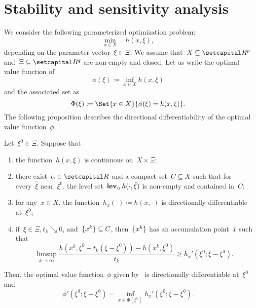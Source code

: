 \documentclass[../main]{subfiles}
\begin{document}
\section{Stability and sensitivity analysis}
We consider the following parameterized optimization problem:
\begin{equation} \label{eq:parameterized}
    \min_{x \in X} \quad h(x, \xi)
,\end{equation} 
depending on the parameter vector~$\xi \in \Xi$.
We assume that~$X \subseteq \setR^p$ and~$\Xi \subseteq \setR^q$ are non-empty and closed.
Let us write the optimal value function of~
\begin{equation} \label{eq:opt_val_fun}
    \phi(\xi) \coloneqq \inf_{x \in X} h(x, \xi)
\end{equation} 
and the associated set as
\begin{equation} \label{eq:opt_sol_map}
    \Phi(\xi) \coloneqq \Set{x \in X}{\phi(\xi) = h(x, \xi)}
.\end{equation} 
The following proposition describes the directional differentiability of the optimal value function~$\phi$.
\begin{proposition} 
    Let~$\xi^0 \in \Xi$.
    Suppose that
    \begin{enumerate}
        \item the function~$h(x, \xi)$ is continuous on~$X \times \Xi$;
        \item there exist~$\alpha \in \setR$ and a compact set~$C \subseteq X$ such that for every~$\hat{\xi}$ near~$\xi^0$, the level set~$\operatorname{\mathbf{lev}}_\alpha h(\cdot, \hat{\xi})$ is non-empty and contained in~$C$;
        \item for any~$x \in X$, the function~$h_x(\cdot) \coloneqq h(x, \cdot)$ is directionally differentiable at~$\xi^0$;
        \item if~$\xi \in \Xi, t_k \searrow 0$, and~$\lbrace x^k\rbrace \subseteq C$, then~$\lbrace x^k\rbrace$ has an accumulation point~$\bar{x}$ such that
            \begin{equation}
                \limsup_{k \to \infty} \frac{h(x^k, \xi^0 + t_k(\xi - \xi^0)) - h(x^k, \xi^0)}{t_k} \ge h_{\bar{x}}'(\xi^0; \xi - \xi^0)
            .\end{equation} 
    \end{enumerate}
    Then, the optimal value function~$\phi$ given by~ is directionally differentiable at~$\xi^0$ and
    \begin{equation}
        \phi'(\xi^0; \xi - \xi^0) = \inf_{x \in \Phi(\xi^0)} h_x'(\xi^0; \xi - \xi^0)
    .\end{equation} 
\end{proposition}
\end{document}

